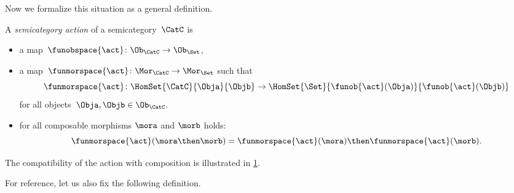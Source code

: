 Now we formalize this situation as a general definition.

\begin{ctdefinition}
    \label{def:semicategory-action}
    A \emph{semicategory action} of a semicategory~$\CatC$ is

    \constit
    \begin{itemize}
        \item a map~$\funobspace{\act} \colon \Ob_{\CatC} \to \Ob_{\Set}$,
        \item a map~$\funmorspace{\act} \colon \Mor_\CatC \to \Mor_\Set$ such that
        \begin{equation*}
            \funmorspace{\act} \colon  \HomSet{\CatC}{\Obja}{\Objb} \to \HomSet{\Set}{ \funob{\act}(\Obja)}{\funob{\act}(\Objb)}
        \end{equation*}
        for all objects~$\Obja, \Objb \in \Ob_{\CatC}$.
    \end{itemize}

    \condit

    \begin{itemize}
        \item for all composable morphisms $\mora$ and $\morb$ holds:
        \begin{equation*}
            \funmorspace{\act}(\mora \then \morb) = \funmorspace{\act}(\mora) \then \funmorspace{\act}(\morb).
        \end{equation*}
    \end{itemize}
\end{ctdefinition}

The compatibility of the action with composition is illustrated in \cref{fig:semicat_ac_comm}.

\begin{figure}[h!]
    \centering
    \caption{}
    \label{fig:semicat_ac_comm}
\end{figure}

For reference, let us also fix the following definition.

